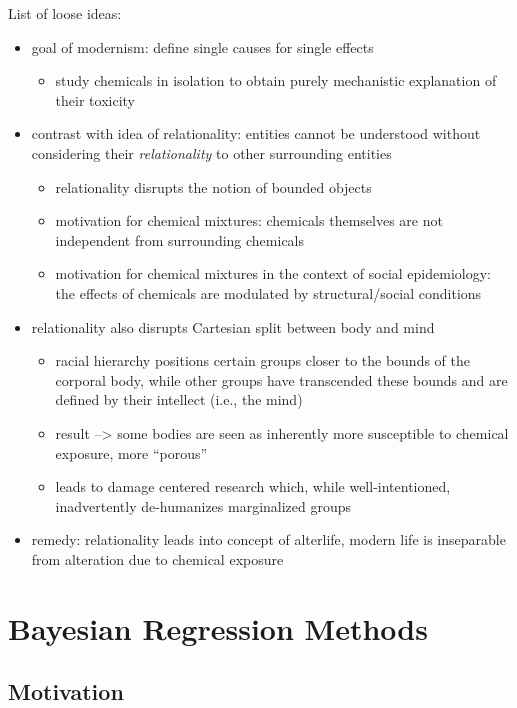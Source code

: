 \documentclass[12pt, twoside]{amherstthesis}
\providecommand{\tightlist}{%
  \setlength{\itemsep}{0pt}\setlength{\parskip}{0pt}}
\begin{document}
List of loose ideas:
\begin{itemize}
\tightlist
\item
  goal of modernism: define single causes for single effects
  \begin{itemize}
  \tightlist
  \item
    study chemicals in isolation to obtain purely mechanistic explanation of their toxicity
  \end{itemize}
\item
  contrast with idea of relationality: entities cannot be understood without considering their \emph{relationality} to other surrounding entities
  \begin{itemize}
  \tightlist
  \item
    relationality disrupts the notion of bounded objects
  \item
    motivation for chemical mixtures: chemicals themselves are not independent from surrounding chemicals
  \item
    motivation for chemical mixtures in the context of social epidemiology: the effects of chemicals are modulated by structural/social conditions
  \end{itemize}
\item
  relationality also disrupts Cartesian split between body and mind
  \begin{itemize}
  \tightlist
  \item
    racial hierarchy positions certain groups closer to the bounds of the corporal body, while other groups have transcended these bounds and are defined by their intellect (i.e., the mind)
  \item
    result --\textgreater{} some bodies are seen as inherently more susceptible to chemical exposure, more ``porous''
  \item
    leads to damage centered research which, while well-intentioned, inadvertently de-humanizes marginalized groups
  \end{itemize}
\item
  remedy: relationality leads into concept of alterlife, modern life is inseparable from alteration due to chemical exposure
\end{itemize}
\hypertarget{bayes}{%
\chapter{Bayesian Regression Methods}\label{bayes}}

\hypertarget{motivation}{%
\section{Motivation}\label{motivation}}
\end{document}
